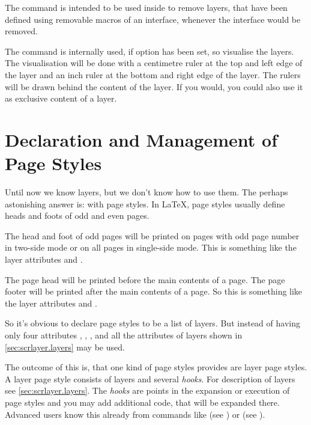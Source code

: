 The command is intended to be used inside
 to remove layers, that have been defined
using removable macros of an interface, whenever the interface would be
removed.%

\begin{Declaration}
\end{Declaration}
%
The command  is internally used, if option
 has been set, so visualise the layers. The visualisation will
be done with a centimetre ruler at the top and left edge of the layer and an
inch ruler at the bottom and right edge of the layer. The rulers will be drawn
behind the content of the layer. If you would, you could also use it as
exclusive content of a layer.%


\section{Declaration and Management of Page Styles}
\label{sec:scrlayer.pagestyles}

Until now we know layers, but we don't know how to use them. The
perhaps astonishing answer is: with page styles. In \LaTeX{}, page
styles usually define heads and foots of odd and even pages.

The head and foot of odd pages will be printed on pages with odd
page number in two-side mode or on all pages in single-side mode. This is
something like the layer attributes  and .

The page head will be printed before the main contents of a page. The page
footer will be printed after the main contents of a page. So this is something
like the layer attributes  and .

So it's obvious to declare page styles to be a list of layers. But instead of
having only four attributes , ,
, and  all the attributes of layers
shown in \autoref{sec:scrlayer.layers} may be used.

The outcome of this is, that one kind of page styles 
provides are layer page styles. A layer page style consists of layers and
several \emph{hooks}. For description of layers see
\autoref{sec:scrlayer.layers}.  The \emph{hooks} are points in the expansion
or execution of page styles and you may add additional code, that will be
expanded there. Advanced users know this already from commands like
 (see \cite{latex:usrguide}) or
 (see
).

